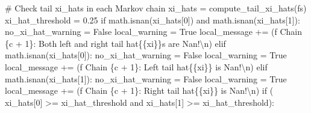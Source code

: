 \documentclass[
  letterpaper,
  DIV=11,
  numbers=noendperiod]{scrartcl}
\newenvironment{Shaded}{\begin{snugshade}}{\end{snugshade}}
\newcommand{\CharTok}[1]{\textcolor[rgb]{0.13,0.47,0.30}{#1}}
\newcommand{\CommentTok}[1]{\textcolor[rgb]{0.37,0.37,0.37}{#1}}
\newcommand{\ControlFlowTok}[1]{\textcolor[rgb]{0.00,0.23,0.31}{#1}}
\newcommand{\DecValTok}[1]{\textcolor[rgb]{0.68,0.00,0.00}{#1}}
\newcommand{\FloatTok}[1]{\textcolor[rgb]{0.68,0.00,0.00}{#1}}
\newcommand{\KeywordTok}[1]{\textcolor[rgb]{0.00,0.23,0.31}{#1}}
\newcommand{\NormalTok}[1]{\textcolor[rgb]{0.00,0.23,0.31}{#1}}
\newcommand{\OperatorTok}[1]{\textcolor[rgb]{0.37,0.37,0.37}{#1}}
\newcommand{\SpecialCharTok}[1]{\textcolor[rgb]{0.37,0.37,0.37}{#1}}
\newcommand{\SpecialStringTok}[1]{\textcolor[rgb]{0.13,0.47,0.30}{#1}}
\newcommand{\StringTok}[1]{\textcolor[rgb]{0.13,0.47,0.30}{#1}}
\newcommand{\VariableTok}[1]{\textcolor[rgb]{0.07,0.07,0.07}{#1}}
\begin{document}
\begin{Shaded}
\begin{Highlighting}[]
      \CommentTok{\# Check tail xi\_hats in each Markov chain}
\NormalTok{      xi\_hats }\OperatorTok{=}\NormalTok{ compute\_tail\_xi\_hats(fs)}
\NormalTok{      xi\_hat\_threshold }\OperatorTok{=} \FloatTok{0.25}
      \ControlFlowTok{if}\NormalTok{ math.isnan(xi\_hats[}\DecValTok{0}\NormalTok{]) }\KeywordTok{and}\NormalTok{ math.isnan(xi\_hats[}\DecValTok{1}\NormalTok{]):}
\NormalTok{        no\_xi\_hat\_warning }\OperatorTok{=} \VariableTok{False}
\NormalTok{        local\_warning }\OperatorTok{=} \VariableTok{True}
\NormalTok{        local\_message }\OperatorTok{+=}\NormalTok{ (}\SpecialStringTok{f\textquotesingle{}  Chain }\SpecialCharTok{\{}\NormalTok{c }\OperatorTok{+} \DecValTok{1}\SpecialCharTok{\}}\SpecialStringTok{: Both left and right tail \textquotesingle{}}
                          \StringTok{\textquotesingle{}hat}\SpecialCharTok{\{\{}\StringTok{xi}\SpecialCharTok{\}\}}\StringTok{s are Nan!}\CharTok{\textbackslash{}n}\StringTok{\textquotesingle{}}\NormalTok{)}
      \ControlFlowTok{elif}\NormalTok{ math.isnan(xi\_hats[}\DecValTok{0}\NormalTok{]):}
\NormalTok{        no\_xi\_hat\_warning }\OperatorTok{=} \VariableTok{False}
\NormalTok{        local\_warning }\OperatorTok{=} \VariableTok{True}
\NormalTok{        local\_message }\OperatorTok{+=}\NormalTok{ (}\SpecialStringTok{f\textquotesingle{}  Chain }\SpecialCharTok{\{}\NormalTok{c }\OperatorTok{+} \DecValTok{1}\SpecialCharTok{\}}\SpecialStringTok{: Left tail \textquotesingle{}}
                          \StringTok{\textquotesingle{}hat}\SpecialCharTok{\{\{}\StringTok{xi}\SpecialCharTok{\}\}}\StringTok{ is Nan!}\CharTok{\textbackslash{}n}\StringTok{\textquotesingle{}}\NormalTok{)}
      \ControlFlowTok{elif}\NormalTok{ math.isnan(xi\_hats[}\DecValTok{1}\NormalTok{]):}
\NormalTok{        no\_xi\_hat\_warning }\OperatorTok{=} \VariableTok{False}
\NormalTok{        local\_warning }\OperatorTok{=} \VariableTok{True}
\NormalTok{        local\_message }\OperatorTok{+=}\NormalTok{ (}\SpecialStringTok{f\textquotesingle{}  Chain }\SpecialCharTok{\{}\NormalTok{c }\OperatorTok{+} \DecValTok{1}\SpecialCharTok{\}}\SpecialStringTok{: Right tail \textquotesingle{}}
                          \StringTok{\textquotesingle{}hat}\SpecialCharTok{\{\{}\StringTok{xi}\SpecialCharTok{\}\}}\StringTok{ is Nan!}\CharTok{\textbackslash{}n}\StringTok{\textquotesingle{}}\NormalTok{)}
      \ControlFlowTok{if}\NormalTok{ (    xi\_hats[}\DecValTok{0}\NormalTok{] }\OperatorTok{\textgreater{}=}\NormalTok{ xi\_hat\_threshold }
          \KeywordTok{and}\NormalTok{ xi\_hats[}\DecValTok{1}\NormalTok{] }\OperatorTok{\textgreater{}=}\NormalTok{ xi\_hat\_threshold):}

\end{Highlighting}
\end{Shaded}
\end{document}
